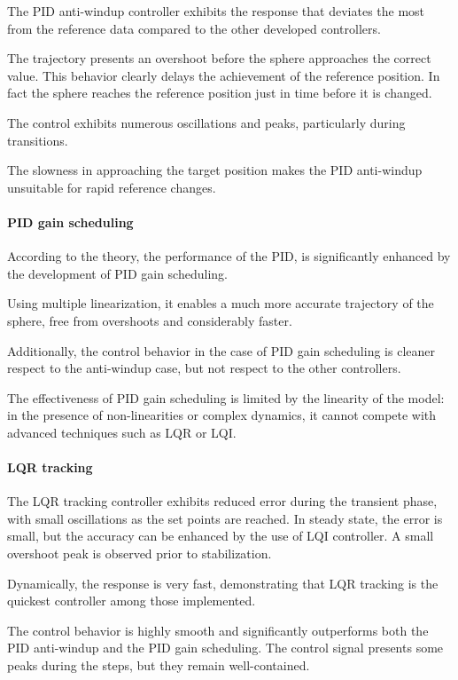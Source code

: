 The PID anti-windup controller exhibits the response that deviates the most from the reference data compared to the other developed controllers.

The trajectory presents an overshoot before the sphere approaches the correct value.
This behavior clearly delays the achievement of the reference position.
In fact the sphere reaches the reference position just in time before it is changed.

The control exhibits numerous oscillations and peaks, particularly during transitions.

The slowness in approaching the target position makes the PID anti-windup unsuitable for rapid reference changes.

\paragraph{PID gain scheduling}

According to the theory, the performance of the PID, is significantly enhanced by the development of PID gain scheduling.

Using multiple linearization, it enables a much more accurate trajectory of the sphere, free from overshoots and considerably faster.

Additionally, the control behavior in the case of PID gain scheduling is cleaner respect to the anti-windup case, but not respect to the other controllers.

The effectiveness of PID gain scheduling is limited by the linearity of the model: in the presence of non-linearities or complex dynamics, it cannot compete with advanced techniques such as LQR or LQI.

\paragraph{LQR tracking}

The LQR tracking controller exhibits reduced error during the transient phase, with small oscillations as the set points are reached.
In steady state, the error is small, but the accuracy can be enhanced by the use of LQI controller.
A small overshoot peak is observed prior to stabilization.

Dynamically, the response is very fast, demonstrating that LQR tracking is the quickest controller among those implemented.

The control behavior is highly smooth and significantly outperforms both the PID anti-windup and the PID gain scheduling.
The control signal presents some peaks during the steps, but they remain well-contained.

